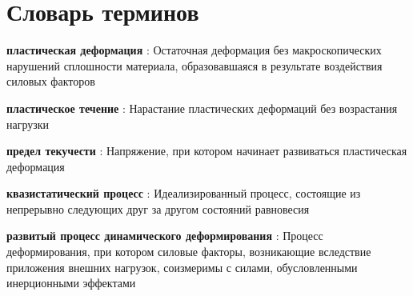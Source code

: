 \chapter*{Словарь терминов}             %

\textbf{пластическая деформация} : Остаточная деформация без макроскопических нарушений сплошности материала, образовавшаяся в результате воздействия силовых факторов

\textbf{пластическое течение} : Нарастание пластических деформаций без возрастания нагрузки

\textbf{предел текучести} : Напряжение, при котором начинает развиваться пластическая деформация

\textbf{квазистатический процесс} : Идеализированный процесс, состоящие из непрерывно следующих друг за другом состояний равновесия

\textbf{развитый процесс динамического деформирования} : Процесс деформирования, при котором силовые факторы, возникающие вследствие приложения внешних нагрузок, соизмеримы с силами, обусловленными инерционными эффектами